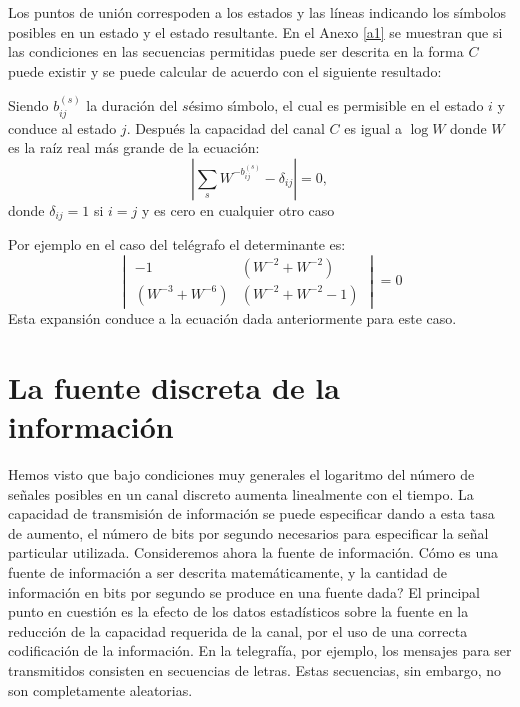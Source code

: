 Los puntos de uni\'on correspoden a los estados y las l\'ineas
indicando los s\'imbolos posibles en un estado y el estado resultante.
En el Anexo \ref{a1} se muestran que si las condiciones en las
secuencias permitidas puede ser descrita en la forma $C$ puede existir
y se puede calcular de acuerdo con el siguiente resultado:
\begin{theorem}
 Siendo $b_{ij}^{(s)}$ la duraci\'on del $s$\'{e}simo s\'{\i}mbolo, el
cual es permisible en el estado $i$ y conduce al estado $j$. Despu\'es la
capacidad del canal $C$ es igual a $\log W$ donde $W$ es la ra\'iz real
m\'as grande de la ecuaci\'on:
\begin{equation}
\left|\sum_{s}W^{-b_{ij}^{(s)}}-\delta_{ij}\right|=0,
\end{equation}
donde $\delta_{ij}=1$ si $i=j$ y es cero en cualquier otro caso
\end{theorem}
Por ejemplo en el caso del tel\'egrafo el determinante es:
\begin{equation}
\begin{vmatrix}
-1&(W^{-2}+W^{-2}) \\ 
 (W^{-3}+W^{-6})&(W^{-2}+W^{-2}-1) 
\end{vmatrix}=0
\end{equation}
Esta expansi\'on conduce a la ecuaci\'on dada anteriormente para este
caso.

\clearpage

\chapter{La fuente discreta de la informaci\'on}
\label{sec:2}

Hemos visto que bajo condiciones muy generales el logaritmo del
n\'umero de se\~nales posibles en un canal discreto aumenta
linealmente con el tiempo. La capacidad de transmisi\'on de
informaci\'on se puede especificar dando a esta tasa de aumento, el
n\'umero de bits por segundo necesarios para especificar la se\~nal
particular utilizada.  Consideremos ahora la fuente de
informaci\'on. {\textquestiondown}C\'omo es una fuente de
informaci\'on a ser descrita matem\'aticamente, y la cantidad de
informaci\'on en bits por segundo se produce en una fuente dada? El
principal punto en cuesti\'on es la efecto de los datos estad\'isticos
sobre la fuente en la reducci\'on de la capacidad requerida de la
canal, por el uso de una correcta codificaci\'on de la
informaci\'on. En la telegraf\'ia, por ejemplo, los mensajes para ser
transmitidos consisten en secuencias de letras. Estas secuencias, sin
embargo, no son completamente aleatorias.

